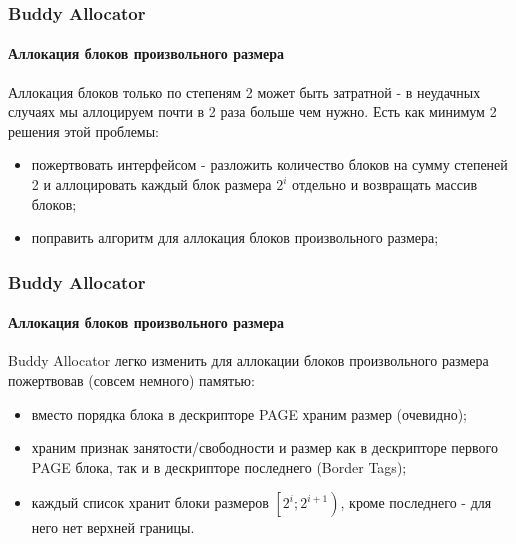 \begin{frame}
\frametitle{Buddy Allocator}
\framesubtitle{Аллокация блоков произвольного размера}

Аллокация блоков только по степеням 2 может быть затратной - в неудачных случаях мы аллоцируем почти в 2 раза больше чем нужно. Есть как минимум 2 решения этой проблемы:

\begin{itemize}
  \item пожертвовать интерфейсом - разложить количество блоков на сумму степеней 2 и аллоцировать каждый блок размера $2^i$ отдельно и возвращать массив блоков;
  \item поправить алгоритм для аллокация блоков произвольного размера;
\end{itemize}
\end{frame}

\begin{frame}
\frametitle{Buddy Allocator}
\framesubtitle{Аллокация блоков произвольного размера}

Buddy Allocator легко изменить для аллокации блоков произвольного размера пожертвовав (совсем немного) памятью:
\begin{itemize}
  \item вместо порядка блока в дескрипторе PAGE храним размер (очевидно);
  \item храним признак занятости/свободности и размер как в дескрипторе первого PAGE блока, так и в дескрипторе последнего (Border Tags);
  \item каждый список хранит блоки размеров $\left[2^i;2^{i+1}\right)$, кроме последнего - для него нет верхней границы.
\end{itemize}
\end{frame}
